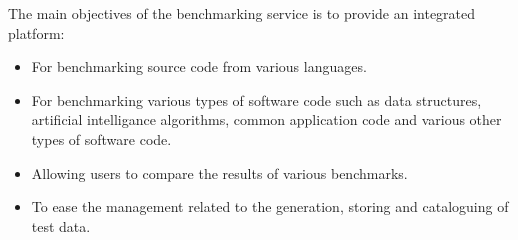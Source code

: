 The main objectives of the benchmarking service is to provide an integrated platform:
\begin{itemize}
	\item For benchmarking source code from various languages.
	\item For benchmarking various types of software code such as data structures, artificial intelligance algorithms, common application code and various other types of software code.
	\item Allowing users to compare the results of various benchmarks.
	\item To ease the management related to the generation, storing and cataloguing of test data.
\end{itemize}